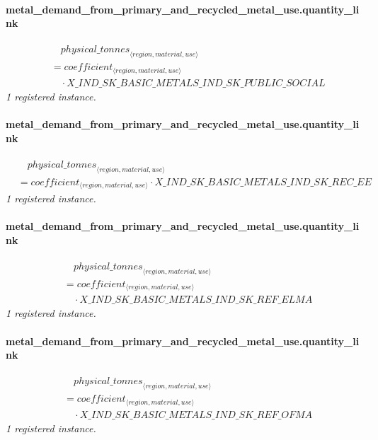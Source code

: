 \documentclass[11pt]{article}
\begin{document}
\paragraph{metal\_demand\_from\_primary\_and\_recycled\_metal\_use.quantity\_link}
\begin{align*}
&\quad {physical\_tonnes}_{\langle region, material, use\rangle}\\
&= coefficient_{\langle region, material, use\rangle}\\
&\quad {}\cdot X\_IND\_SK\_BASIC\_METALS\_IND\_SK\_PUBLIC\_SOCIAL
\end{align*}
\noindent\emph{1 registered instance.}\par
\paragraph{metal\_demand\_from\_primary\_and\_recycled\_metal\_use.quantity\_link}
\begin{align*}
&\quad {physical\_tonnes}_{\langle region, material, use\rangle}\\
&= coefficient_{\langle region, material, use\rangle} \cdot X\_IND\_SK\_BASIC\_METALS\_IND\_SK\_REC\_EE
\end{align*}
\noindent\emph{1 registered instance.}\par
\paragraph{metal\_demand\_from\_primary\_and\_recycled\_metal\_use.quantity\_link}
\begin{align*}
&\quad {physical\_tonnes}_{\langle region, material, use\rangle}\\
&= coefficient_{\langle region, material, use\rangle}\\
&\quad {}\cdot X\_IND\_SK\_BASIC\_METALS\_IND\_SK\_REF\_ELMA
\end{align*}
\noindent\emph{1 registered instance.}\par
\paragraph{metal\_demand\_from\_primary\_and\_recycled\_metal\_use.quantity\_link}
\begin{align*}
&\quad {physical\_tonnes}_{\langle region, material, use\rangle}\\
&= coefficient_{\langle region, material, use\rangle}\\
&\quad {}\cdot X\_IND\_SK\_BASIC\_METALS\_IND\_SK\_REF\_OFMA
\end{align*}
\noindent\emph{1 registered instance.}\par
\end{document}
